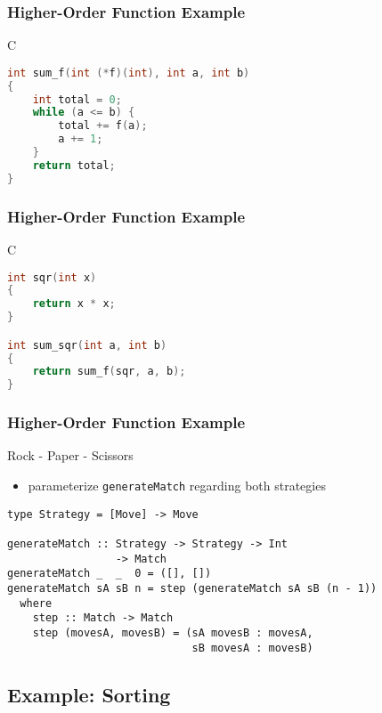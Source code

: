 \documentclass[dvipsnames]{beamer}
\theoremstyle{plain}
\begin{document}
\begin{frame}[fragile]
  \frametitle{Higher-Order Function Example}

  \begin{exampleblock}{C}
    \begin{lstlisting}[language=C]
int sum_f(int (*f)(int), int a, int b)
{
    int total = 0;
    while (a <= b) {
        total += f(a);
        a += 1;
    }
    return total;
}
    \end{lstlisting}
  \end{exampleblock}
\end{frame}

\begin{frame}[fragile]
  \frametitle{Higher-Order Function Example}

  \begin{exampleblock}{C}
    \begin{lstlisting}[language=C]
int sqr(int x)
{
    return x * x;
}

int sum_sqr(int a, int b)
{
    return sum_f(sqr, a, b);
}
    \end{lstlisting}
  \end{exampleblock}
\end{frame}

\begin{frame}[fragile]
  \frametitle{Higher-Order Function Example}

  \begin{exampleblock}{Rock - Paper - Scissors}
    \begin{itemize}
      \item parameterize \lstinline|generateMatch| regarding both strategies
    \end{itemize}

    \begin{lstlisting}
type Strategy = [Move] -> Move

generateMatch :: Strategy -> Strategy -> Int
                 -> Match
generateMatch _  _  0 = ([], [])
generateMatch sA sB n = step (generateMatch sA sB (n - 1))
  where
    step :: Match -> Match
    step (movesA, movesB) = (sA movesB : movesA,
                             sB movesA : movesB)
    \end{lstlisting}
  \end{exampleblock}
\end{frame}

\subsection{Example: Sorting}
\end{document}
